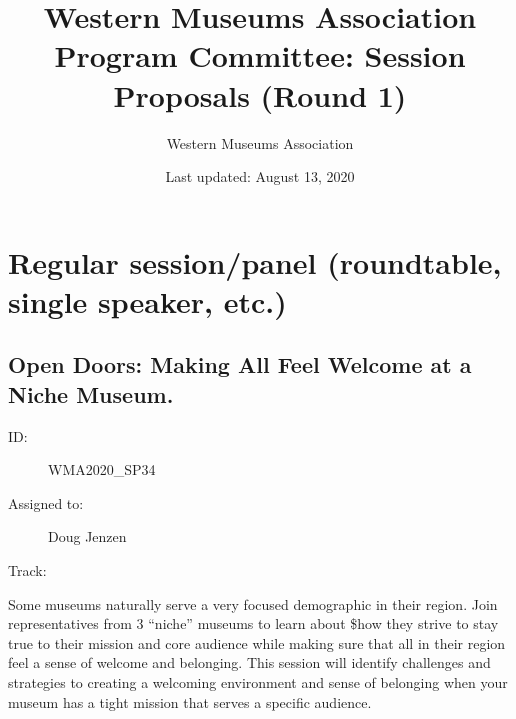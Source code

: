 \documentclass{report}
\title{ Western Museums Association Program Committee: Session Proposals (Round 1)}
\date{ Last updated: August 13, 2020}
\author{Western Museums Association}
\begin{document}
  \maketitle
  \newpage
  \tableofcontents
  \newpage
  
    \newpage
    \chapter*{ Regular session/panel (roundtable, single speaker, etc.) }

      
        
        
        
        
          \newpage
          \section{ Open Doors:  Making All Feel Welcome at a Niche Museum.  }
            \begin{description}
              \item [ID:]
              WMA2020\_SP34

              \item [Assigned to:]Doug Jenzen~
                \item [Track:]
              \end{description}

              Some museums naturally serve a very focused demographic in their region. Join representatives from 3 “niche” museums to learn about \$how they strive to stay true to their mission and core audience while making sure that all in their region feel a sense of welcome and belonging. This session will identify challenges and strategies to creating a welcoming environment and sense of belonging when your museum has a tight mission that serves a specific audience.
\end{document}
